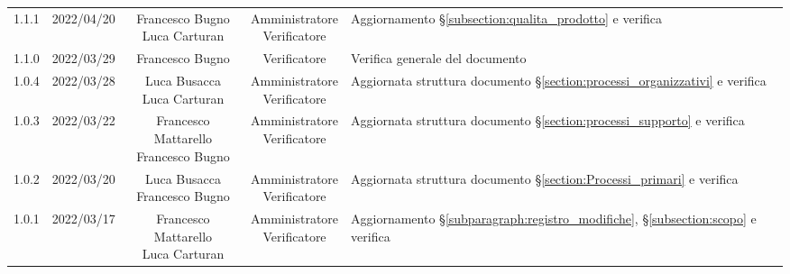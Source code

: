 \begin{center}
\begin{longtable}[c]{c | c | c | c | p{5cm}}
		1.1.1                                                      & 2022/04/20 & \Longunderstack{Francesco Bugno                                                                                                                                                                   \\Luca Carturan} & \Longunderstack{Amministratore\\Verificatore} & Aggiornamento §\ref{subsection:qualita_prodotto} e verifica\\
		1.1.0                                                      & 2022/03/29 & Francesco Bugno                      & Verificatore   & Verifica generale del documento                                                                                                           \\
		1.0.4                                                      & 2022/03/28 & \Longunderstack{Luca Busacca                                                                                                                                                                      \\Luca Carturan} & \Longunderstack{Amministratore\\Verificatore} & Aggiornata struttura documento §\ref{section:processi_organizzativi} e verifica\\
		1.0.3                                                      & 2022/03/22 & \Longunderstack{Francesco Mattarello                                                                                                                                                              \\Francesco Bugno} & \Longunderstack{Amministratore\\Verificatore} & Aggiornata struttura documento §\ref{section:processi_supporto} e verifica\\
		1.0.2                                                      & 2022/03/20 & \Longunderstack{Luca Busacca                                                                                                                                                                      \\Francesco Bugno} & \Longunderstack{Amministratore\\Verificatore} & Aggiornata struttura documento §\ref{section:Processi_primari} e verifica\\
		1.0.1                                                      & 2022/03/17 & \Longunderstack{Francesco Mattarello                                                                                                                                                              \\Luca Carturan} & \Longunderstack{Amministratore\\Verificatore} &  Aggiornamento §\ref{subparagraph:registro_modifiche}, §\ref{subsection:scopo} e verifica\\


\end{longtable}
\end{center}
